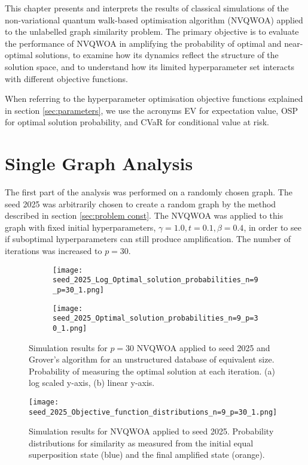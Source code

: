 This chapter presents and interprets the results of classical simulations of the non-variational quantum walk-based optimisation algorithm (NVQWOA) applied to the unlabelled graph similarity problem. The primary objective is to evaluate the performance of NVQWOA in amplifying the probability of optimal and near-optimal solutions, to examine how its dynamics reflect the structure of the solution space, and to understand how its limited hyperparameter set interacts with different objective functions.

When referring to the hyperparameter optimisation objective functions explained in section \ref{sec:parameters}, we use the acronyms EV for expectation value, OSP for optimal solution probability, and CVaR for conditional value at risk.

\section{Single Graph Analysis}
The first part of the analysis was performed on a randomly chosen graph. The seed 2025 was arbitrarily chosen to create a random graph by the method described in section \ref{sec:problem const}. The NVQWOA was applied to this graph with fixed initial hyperparameters, $\gamma=1.0, t=0.1, \beta=0.4$, in order to see if suboptimal hyperparameters can still produce amplification. The number of iterations was increased to $p=30$.

\begin{figure}[htbp]
\centering
\begin{subfigure}{0.45\textwidth}
\texttt{[image: seed\_2025\_Log\_Optimal\_solution\_probabilities\_n=9\_p=30\_1.png]}
\caption{ }
\label{fig:2025 log optimal}
\end{subfigure}
\hfill
\begin{subfigure}{0.45\textwidth}
\texttt{[image: seed\_2025\_Optimal\_solution\_probabilities\_n=9\_p=30\_1.png]}
\caption{ }
\label{fig:2025 optimal}
\end{subfigure}
\caption{Simulation results for $p=30$ NVQWOA applied to seed 2025 and Grover's algorithm for an unstructured database of equivalent size. Probability of measuring the optimal solution at each iteration. (a) log scaled y-axis, (b) linear y-axis.}
\label{fig:2025 osp}
\end{figure}

\begin{figure}[htbp]
    \centering
    \texttt{[image: seed\_2025\_Objective\_function\_distributions\_n=9\_p=30\_1.png]}
    \caption{Simulation results for NVQWOA applied to seed 2025. Probability distributions for similarity as measured from the initial equal superposition state (blue) and the final amplified state (orange).}
    \label{fig:2025 similarity dist}
\end{figure}


